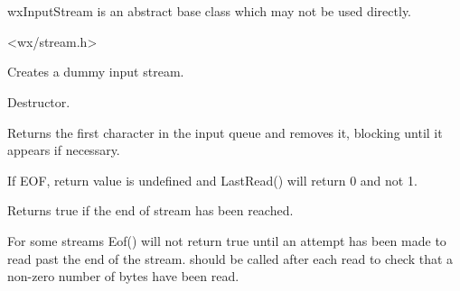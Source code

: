 \section{}\label{wxinputstream}

wxInputStream is an abstract base class which may not be used directly.




<wx/stream.h>


\label{wxinputstreamctor}


Creates a dummy input stream.

\label{wxinputstreamdtor}


Destructor.

\label{wxinputstreamgetc}


Returns the first character in the input queue and removes it, 
blocking until it appears if necessary.


If EOF, return value is undefined and LastRead() will return 0 and not 1.

\label{wxinputstreameof}


Returns true if the end of stream has been reached.


For some streams Eof() will not return true until an
attempt has been made to read past the end of the stream.
should be called after each read to check that
a non-zero number of bytes have been read.

\label{wxinputstreamlastread}

